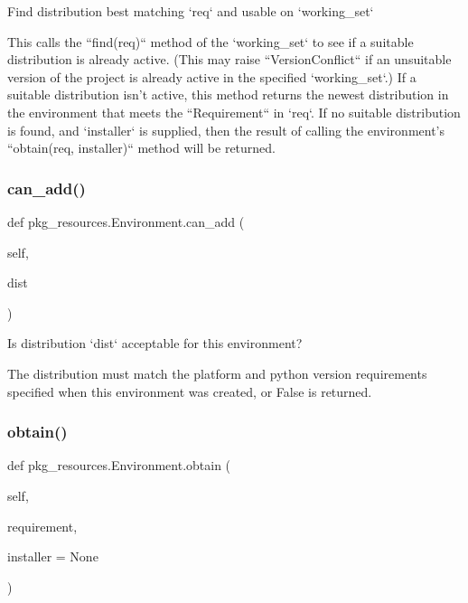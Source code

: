 \begin{DoxyVerb}Find distribution best matching `req` and usable on `working_set`

This calls the ``find(req)`` method of the `working_set` to see if a
suitable distribution is already active.  (This may raise
``VersionConflict`` if an unsuitable version of the project is already
active in the specified `working_set`.)  If a suitable distribution
isn't active, this method returns the newest distribution in the
environment that meets the ``Requirement`` in `req`.  If no suitable
distribution is found, and `installer` is supplied, then the result of
calling the environment's ``obtain(req, installer)`` method will be
returned.
\end{DoxyVerb}
 \mbox{\label{classpkg__resources_1_1_environment_ac68862356ee785bb410b3d2a503952f1}} 
\subsubsection{\texorpdfstring{can\+\_\+add()}{can\_add()}}
{\footnotesize\ttfamily def pkg\+\_\+resources.\+Environment.\+can\+\_\+add (\begin{DoxyParamCaption}\item[{}]{self,  }\item[{}]{dist }\end{DoxyParamCaption})}

\begin{DoxyVerb}Is distribution `dist` acceptable for this environment?

The distribution must match the platform and python version
requirements specified when this environment was created, or False
is returned.
\end{DoxyVerb}
 \mbox{\label{classpkg__resources_1_1_environment_af631296df13a518bb3cd97f04efa25fd}} 
\subsubsection{\texorpdfstring{obtain()}{obtain()}}
{\footnotesize\ttfamily def pkg\+\_\+resources.\+Environment.\+obtain (\begin{DoxyParamCaption}\item[{}]{self,  }\item[{}]{requirement,  }\item[{}]{installer = {\ttfamily None} }\end{DoxyParamCaption})}

